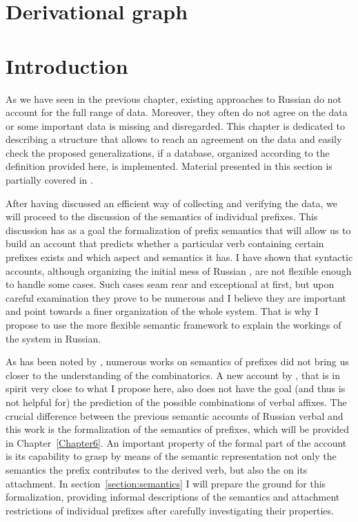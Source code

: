 
\section{Derivational graph}\label{section:graph}

\section{Introduction}
As we have seen in the previous chapter, existing approaches to Russian  do not account for the full range of data. Moreover, they often do not agree on the data or some important data is missing and disregarded. This chapter is dedicated to describing a structure that allows to reach an agreement on the  data and easily check the proposed generalizations, if a database, organized according to the definition provided here, is implemented. Material presented in this section is partially covered in \citet{ZinovaFilip:14b}.

After having discussed an efficient way of collecting and verifying the data, we will proceed to the discussion of the semantics of individual prefixes. This discussion has as a goal the formalization of prefix semantics that will allow us to build an account that predicts whether a particular verb containing certain prefixes exists and which aspect and semantics it has. I have shown that syntactic accounts, although organizing the initial mess of Russian , are not flexible enough to handle some cases. Such cases seam rear and exceptional at first, but upon careful examination they prove to be numerous and I believe they are important and point towards a finer organization of the whole system. That is why I propose to use the more flexible semantic framework to explain the workings of the  system in Russian.

As has been noted by \citet{Tatevosov:09}, numerous works on semantics of prefixes \citep[][among others]{Avilova:64, Golovin:59, Lopatin:97, Tixonov:98} did not bring us closer to the understanding of the  combinatorics. A new account by \citet{Kagan:book}, that is in spirit very close to what I propose here, also does not have the goal (and thus is not helpful for) the prediction of the possible combinations of verbal affixes. The crucial difference between the previous semantic accounts of Russian verbal  and this work is the formalization of the semantics of prefixes, which will be provided in Chapter~\ref{Chapter6}. An important property of the formal part of the account is its capability to grasp by means of the semantic representation not only the semantics the prefix contributes to the derived verb, but also the  on its attachment. In section~\ref{section:semantics} I will prepare the ground for this formalization, providing informal descriptions of the semantics and attachment restrictions of individual prefixes after carefully investigating their properties. 

